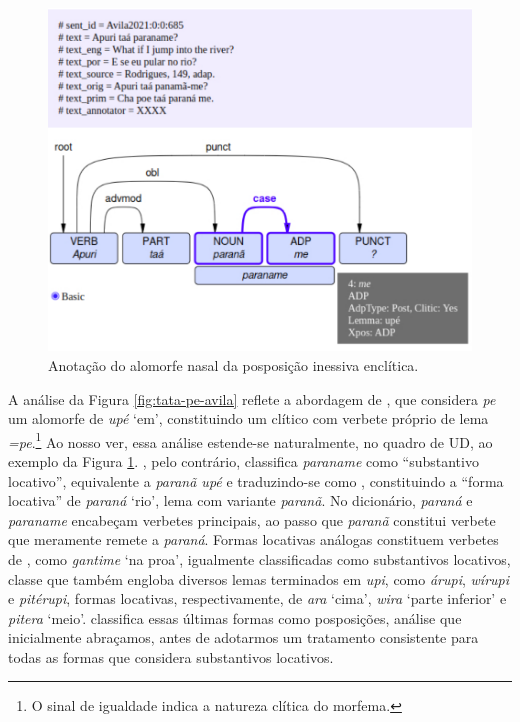 \documentclass[portuguese]{textolivre}
\newcommand{\wt}[2]{\textit{#1} `#2'}
\begin{document}
\begin{figure}[htbp]
  \centering
  \begin{minipage}{.75\textwidth}
    \includegraphics[width=\linewidth]{figures/paraname-avila.pdf}
    \caption{Anotação do alomorfe nasal da posposição inessiva enclítica.}
    \label{fig:paraname-avila}
  \end{minipage}
\end{figure}

A análise da Figura \ref{fig:tata-pe-avila} reflete a abordagem de \textcite[p. 588]{avila2021}, que considera \textit{pe} um alomorfe de \wt{upé}{em}, constituindo um clítico com verbete próprio de lema \textit{=pe}.\footnote{O sinal de igualdade indica a natureza clítica do morfema.} Ao nosso ver, essa análise estende-se naturalmente, no quadro de UD, ao exemplo da Figura \ref{fig:paraname-avila}. \textcite[p. 580]{avila2021}, pelo contrário, classifica \textit{paraname} como ``substantivo locativo'', equivalente a \textit{paranã upé} e traduzindo-se como , constituindo a ``forma locativa'' de \wt{paraná}{rio}, lema com variante \textit{paranã}. No dicionário, \textit{paraná} e \textit{paraname} encabeçam verbetes principais, ao passo que \textit{paranã} constitui verbete que meramente remete a \textit{paraná}. Formas locativas análogas constituem verbetes de \textcite{avila2021}, como \wt{gantime}{na proa}, igualmente classificadas como substantivos locativos, classe que também engloba diversos lemas terminados em \textit{upi}, como \textit{árupi}, \textit{wírupi} e \textit{pitérupi}, formas locativas, respectivamente, de \wt{ara}{cima}, \wt{wira}{parte inferior} e \wt{pitera}{meio}. \textcite{navarro2016} classifica essas últimas formas como posposições, análise que inicialmente abraçamos, antes de adotarmos um tratamento consistente para todas as formas que \textcite{avila2021} considera substantivos locativos.  
\end{document}
